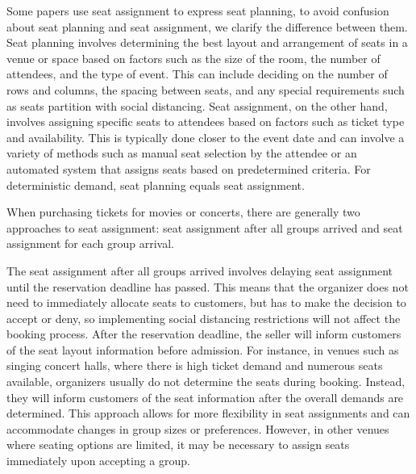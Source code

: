 Some papers use seat assignment to express seat planning, to avoid confusion about seat planning and seat assignment, we clarify the difference between them. Seat planning involves determining the best layout and arrangement of seats in a venue or space based on factors such as the size of the room, the number of attendees, and the type of event. This can include deciding on the number of rows and columns, the spacing between seats, and any special requirements such as seats partition with social distancing. Seat assignment, on the other hand, involves assigning specific seats to attendees based on factors such as ticket type and availability. This is typically done closer to the event date and can involve a variety of methods such as manual seat selection by the attendee or an automated system that assigns seats based on predetermined criteria. For deterministic demand, seat planning equals seat assignment.




When purchasing tickets for movies or concerts, there are generally two approaches to seat assignment: seat assignment after all groups arrived and seat assignment for each group arrival.

The seat assignment after all groups arrived involves delaying seat assignment until the reservation deadline has passed. This means that the organizer does not need to immediately allocate seats to customers, but has to make the decision to accept or deny, so implementing social distancing restrictions will not affect the booking process. After the reservation deadline, the seller will inform customers of the seat layout information before admission. For instance, in venues such as singing concert halls, where there is high ticket demand and numerous seats available, organizers usually do not determine the seats during booking. Instead, they will inform customers of the seat information after the overall demands are determined. This approach allows for more flexibility in seat assignments and can accommodate changes in group sizes or preferences. However, in other venues where seating options are limited, it may be necessary to assign seats immediately upon accepting a group.

